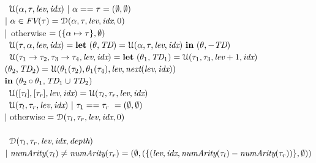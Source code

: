 \documentclass[12pt]{report}	%
\begin{document}
\begin{figure}
\begin{minipage}{1\columnwidth}
\begin{qprogram}
\ofType{\ualg}{\mt \times \mt \times \level \times \idx \to \subtt \times \sieves} \\[3pt]
%
\nameva\ $\mathcal U(\alpha,\tau,\textit{lev},\textit{idx})\ |\ \alpha == \tau = (\emptyset,\emptyset) $ \\%
\phantom{\nameva\ $\ualg(\tv,\mt,\level,\idx) $} $
                                 |\ \tv \in \FV{\mt} = \dalg(\tv,\mt,\level,\idx,0) $ \\
\phantom{\nameva\ $\ualg(\tv,\mt,\level,\idx) $}
                                 |\ otherwise $ = (\set{\map{\tv}{\mt}},\emptyset)$ \\[3pt]
%
\namevb\ $\mathcal U(\tau,\alpha,\textit{lev},\textit{idx}) =
    \textbf{let}\ (\theta,\textit{TD}) = \mathcal U(\alpha,\tau,\textit{lev},\textit{idx})\
    \textbf{in}\ (\theta,-\textit{TD}) $ \\[3pt]
%
\namevc\ $\mathcal U(\tau_1 \to \tau_2, \tau_3 \to \tau_4,\textit{lev},\textit{idx})
            = \textbf{let}\ (\theta_1,\textit{TD}_1) = \mathcal U(\tau_1,\tau_3,\textit{lev} + 1,\textit{idx}) $\\
$    (\theta_2,\textit{TD}_2) = \mathcal U(\theta_1(\tau_2),\theta_1(\tau_4),\textit{lev},\textit{next}(\textit{lev},\textit{idx})) $\\
\phantom{\namevc\ $\ualg(\level,\idx,\mt_1 \to \mt_2, \mt_3 \to \mt_4)lxl$}
$    \textbf{in}\ (\com{\subtt_2}{\subtt_1}, \union{\td_1}{\td_2}) $ \\[3pt]
%
\namevd\ $\mathcal U([\tau_l],[\tau_r],\textit{lev},\textit{idx}) = \mathcal U(\tau_l,\tau_r,\textit{lev},\textit{idx})$ \\[3pt]
%
\nameve\ $\mathcal U(\tau_l,\tau_r,\textit{lev},\textit{idx})\ |\ \tau_1 == \tau_r \phantom{l} = (\emptyset,\emptyset)$ \\
\phantom {\nameve $\ualg(\level,\idx,\mt_l,\mt_r)\ $}
    $|\ \text{otherwise} =\mathcal D(\tau_l,\tau_r,\textit{lev},\textit{idx},0)$ \\[6pt]
%
\ofType{\dalg}{\mt \times \mt \times \level\times \idx \times \depth \to \subtt \times \sieves} \\[3pt]
\namevf\ $\mathcal D(\tau_l,\tau_r,\textit{lev},\textit{idx},\textit{depth})$ \\
\phantom{abcd} $ |\ \length(\mt_l) \neq \length(\mt_r) = (\emptyset,(\set{(\level,\idx,\length(\mt_l) - \length(\mt_r))},\emptyset)) $ \\[3pt]

\end{qprogram}
\end{minipage}
\end{figure}
\end{document}
